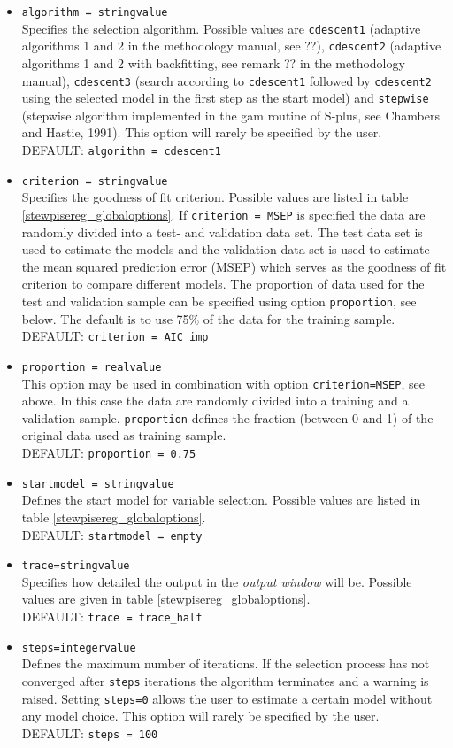 \begin{itemize}
\item {\tt algorithm = stringvalue} \\
Specifies the selection algorithm. Possible values are {\tt cdescent1} (adaptive algorithms 1 and 2 in the methodology manual, see ??),
{\tt cdescent2} (adaptive algorithms  1 and 2 with backfitting, see remark ?? in the methodology manual), {\tt cdescent3} (search according to
{\tt cdescent1}  followed by {\tt cdescent2}  using the selected model in the first step as the start model) and {\tt stepwise}
(stepwise algorithm implemented in the gam routine of S-plus, see Chambers and Hastie, 1991).
This option will rarely be specified by the user. \\
DEFAULT: {\tt algorithm = cdescent1}
\item {\tt criterion = stringvalue} \\
Specifies the goodness of  fit criterion. Possible values are listed in table \ref{stewpisereg_globaloptions}. If {\tt criterion = MSEP} is specified
the data are randomly divided into a test- and validation data set. The test data set is used to estimate the models and the validation data set is used to
estimate the mean squared prediction error (MSEP) which serves as the goodness of fit criterion to compare different models. The proportion of data used for
the test and validation sample can be specified using option {\tt proportion}, see below. The default is to use 75\% of the data for the training sample. \\
DEFAULT: {\tt criterion = AIC\_imp}
\item {\tt proportion = realvalue} \\
This option may be used in combination with option {\tt criterion=MSEP}, see above. In this case the data are randomly divided into
a training and a validation sample. {\tt proportion} defines the fraction (between 0 and 1)  of the original data used as training sample. \\
DEFAULT: {\tt proportion = 0.75}
\item {\tt startmodel = stringvalue} \\
Defines the start model for variable selection. Possible values are listed in table \ref{stewpisereg_globaloptions}. \\
DEFAULT: {\tt startmodel = empty}
\item {\tt trace=stringvalue} \\
Specifies how detailed the output in the {\it output window} will be. Possible values are given in table \ref{stewpisereg_globaloptions}. \\
DEFAULT: {\tt trace = trace\_half}
\item {\tt steps=integervalue}   \\
Defines the maximum number of iterations.  If the selection process  has not converged after {\tt steps} iterations the algorithm terminates and a warning is
raised. Setting {\tt steps=0} allows the user to estimate a certain model without any model choice. This option will rarely be specified by the user.\\
DEFAULT: {\tt steps = 100}
\end{itemize}


